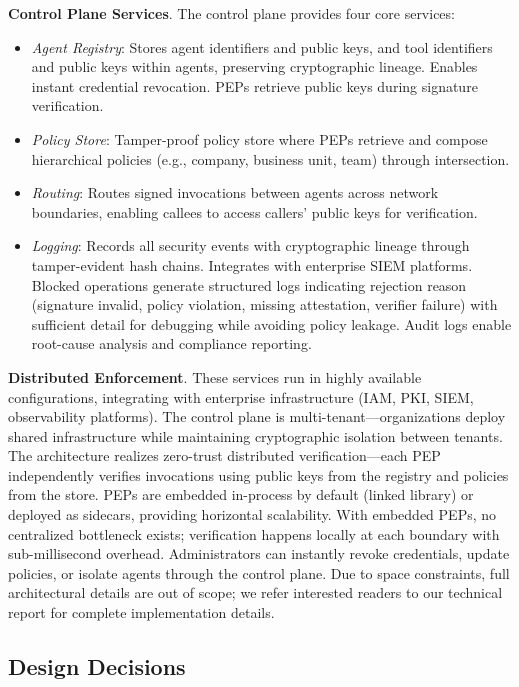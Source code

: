 \textbf{Control Plane Services}. The control plane provides four core services:
\begin{itemize}
\item \textit{Agent Registry}: Stores agent identifiers and public keys, and tool identifiers and public keys within agents, preserving cryptographic lineage. Enables instant credential revocation. PEPs retrieve public keys during signature verification.

\item \textit{Policy Store}: Tamper-proof policy store where PEPs retrieve and compose hierarchical policies (e.g., company, business unit, team) through intersection.

\item \textit{Routing}: Routes signed invocations between agents across network boundaries, enabling callees to access callers' public keys for verification.

\item \textit{Logging}: Records all security events with cryptographic lineage through tamper-evident hash chains. Integrates with enterprise SIEM platforms. Blocked operations generate structured logs indicating rejection reason (signature invalid, policy violation, missing attestation, verifier failure) with sufficient detail for debugging while avoiding policy leakage. Audit logs enable root-cause analysis and compliance reporting.
\end{itemize}

\textbf{Distributed Enforcement}. These services run in highly available configurations, integrating with enterprise infrastructure (IAM, PKI, SIEM, observability platforms). The control plane is multi-tenant—organizations deploy shared infrastructure while maintaining cryptographic isolation between tenants. The architecture realizes zero-trust distributed verification—each PEP independently verifies invocations using public keys from the registry and policies from the store. 
PEPs are embedded in-process by default (linked library) or deployed as sidecars, providing horizontal scalability. 
With embedded PEPs, no centralized bottleneck exists; verification happens locally at each boundary with sub-millisecond overhead. 
Administrators can instantly revoke credentials, update policies, or isolate agents through the control plane. Due to space constraints, full architectural details are out of scope; we refer interested readers to our technical report for complete implementation details.

\subsection{Design Decisions}

